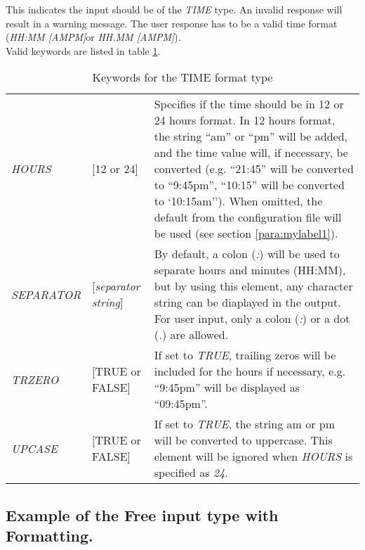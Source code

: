 \documentclass[a4paper]{book}
\begin{document}
This indicates the input should be of the \textsl{TIME} type. An invalid response 
will result in a warning message. The user response has to be a valid time 
format (\textsl{HH:MM [AM\textbar PM]}or \textsl{HH.MM [AM\textbar PM]}).\\ 
Valid keywords are listed in table \ref{tab:time}.

\begin{table}[h!tb]
\begin{minipage}[h!tb]{\textwidth}
\begin{tabular}{llp{6cm}} \hline
\textsl{HOURS} & [\textsf{12} or \textsf{24}] &  Specifies if the time should be in 12 or 24 hours format. In 
12 hours format, the string ``am'' or ``pm'' will be added, and the time 
value will, if necessary, be converted (e.g. ``21:45'' will be converted 
to ``9:45pm'', ``10:15'' will be converted to `10:15am''). \linebreak
When omitted, the default from the configuration file will be 
used (see section \ref{para:mylabel1}).\\
\textsl{SEPARATOR} & [\textit{separator string}] & By default, a colon (\textsl{:}) will be used to separate hours and minutes 
(HH:MM), but by using this element, any character string can 
be diaplayed in the output. For user input, only a colon (\textsl{:}) or a dot (\textsl{.}) are allowed. \\
\textsl{TRZERO} & [\textsf{TRUE} or \textsf{FALSE}] & If set to \textsl{TRUE}, trailing zeros will be included for the hours 
if necessary, e.g. ``9:45pm'' will be displayed as ``09:45pm''.\\
\textsl{UPCASE} & [\textsf{TRUE} or \textsf{FALSE}] &  If set to \textsl{TRUE}, the string am or pm will be converted to uppercase. 
This element will be ignored when \textsl{HOURS} is specified as \textsl{24}. \\ \hline
\end{tabular}
\caption{Keywords for the TIME format type}\label{tab:time}
\end{minipage}
\end{table}

\subsection{Example of the Free input type with Formatting.}\label{subsubsec:mylabel38}
\end{document}

